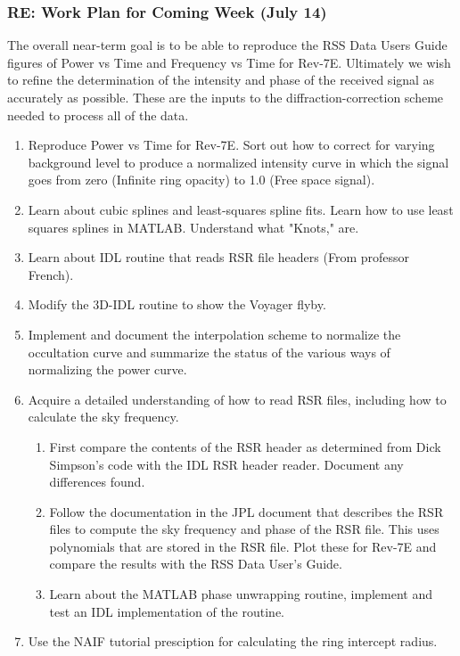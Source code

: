 \documentclass[crop=false,class=book]{standalone}
\begin{document}
\subsubsection{\footnotesize RE: Work Plan for Coming Week (July 14)}
The overall near-term goal is to be able to reproduce the RSS Data Users Guide figures of Power vs Time and Frequency vs Time for Rev-7E. Ultimately we wish to refine the determination of the intensity and phase of the received signal as accurately as possible. These are the inputs to the diffraction-correction scheme needed to process all of the data.
\begin{enumerate}
    \item Reproduce Power vs Time for Rev-7E. Sort out how to correct for varying background level to produce a normalized intensity curve in which the signal goes from zero (Infinite ring opacity) to 1.0 (Free space signal).
    \item Learn about cubic splines and least-squares spline fits. Learn how to use least squares splines in MATLAB. Understand what "Knots," are.
    \item Learn about IDL routine that reads RSR file headers (From professor French).
    \item Modify the 3D-IDL routine to show the Voyager flyby.
    \item Implement and document the interpolation scheme to normalize the occultation curve and summarize the status of the various ways of normalizing the power curve.
    \item Acquire a detailed understanding of how to read RSR files, including how to calculate the sky frequency.
    \begin{enumerate}
        \item First compare the contents of the RSR header as determined from Dick Simpson's code with the IDL RSR header reader. Document any differences found.
        \item Follow the documentation in the JPL document that describes the RSR files to compute the sky frequency and phase of the RSR file. This uses polynomials that are stored in the RSR file. Plot these for Rev-7E and compare the results with the RSS Data User's Guide.
        \item Learn about the MATLAB phase unwrapping routine, implement and test an IDL implementation of the routine.
    \end{enumerate}
    \item Use the NAIF tutorial presciption for calculating the ring intercept radius.
\end{enumerate}
\end{document}
